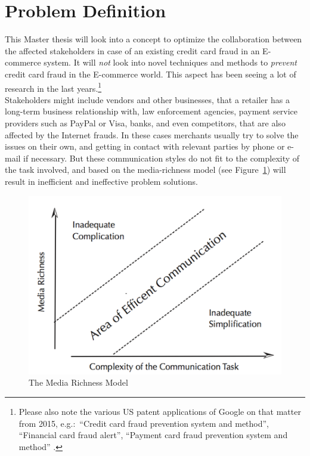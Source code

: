 
\section{Problem Definition}
\label{sec:problem_definition}

This Master thesis will look into a concept to optimize the collaboration between the affected stakeholders in case of an existing credit card fraud in an \gls{E-commerce} system. It will \emph{not} look into novel techniques and methods to \emph{prevent} credit card fraud in the \gls{E-commerce} world. This aspect has been seeing a lot of research in the last years.\footnote{Please also note the various US patent applications of Google on that matter from 2015, e.g.:\ “Credit card fraud prevention system and method”, “Financial card fraud alert”, “Payment card fraud prevention system and method” \citep{GooglePatents2015}.} \\

Stakeholders might include vendors and other businesses, that a retailer has a long-term business relationship with, law enforcement agencies, payment service providers such as PayPal or Visa, banks, and even competitors, that are also affected by the Internet frauds. In these cases merchants usually try to solve the issues on their own, and getting in contact with relevant parties by phone or e-mail if necessary. But these communication styles do not fit to the complexity of the task involved, and based on the media-richness model (see Figure~\ref{fig:images_media_richness_model}) will result in inefficient and ineffective problem solutions. \\

\begin{figure}[!ht]
	\centering
		\includegraphics[width=0.9\columnwidth]{images/media-richness-model.png}
	\caption[The Media Richness Model]{The Media Richness Model \citep{Rice1992}}
\label{fig:images_media_richness_model}
\end{figure}

